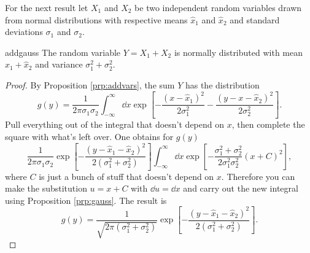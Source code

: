 For the next result 
let $X_1$ and $X_2$ be two independent random variables drawn from normal
distributions with respective means $\hat{x}_1$ and $\hat{x}_2$ and
standard deviations $\sigma_1$ and $\sigma_2$. 
\begin{proposition}{}{addgauss}
  The random variable $Y=X_1+X_2$ is normally distributed with mean
  $\hat{x}_1+\hat{x}_2$ and variance $\sigma_1^2+\sigma_2^2$.
  \begin{proof}
    By Proposition \ref{prp:addvars}, the sum $Y$ has the distribution
    \begin{equation*}
      g(y)=\frac{1}{2\pi\sigma_1\sigma_2}
           \int_{-\infty}^\infty\dd{x}\exp\left[
             -\frac{(x-\hat{x}_1)^2}{2\sigma_1^2}
             -\frac{(y-x-\hat{x}_2)^2}{2\sigma_2^2}\right].
    \end{equation*}
    Pull everything out of the integral that doesn't depend on $x$,
    then complete the square with what's left over.
    One obtains for $g(y)$
    $$
      \frac{1}{2\pi\sigma_1\sigma_2}
           \exp\left[-\frac{(y-\hat{x}_1-\hat{x}_2)^2}
                      {2(\sigma_1^2+\sigma_2^2)}\right]
           \int_{-\infty}^\infty\dd{x}
           \exp\left[-\frac{\sigma_1^2+\sigma_2^2}
                     {2\sigma_1^2\sigma_2^2}(x+C)^2\right],
    $$
    where $C$ is just a bunch of stuff that doesn't depend on $x$.
    Therefore you can make the substitution $u=x+C$ with $\dd u=\dd x$ and
    carry out the new integral using Proposition \ref{prp:gauss}.
    The result is
    \begin{equation*}
      g(y)=\frac{1}{\sqrt{2\pi(\sigma_1^2+\sigma_2^2)}}
           \exp\left[-\frac{(y-\hat{x}_1-\hat{x}_2)^2}
                      {2(\sigma_1^2+\sigma_2^2)}\right].
    \end{equation*}
  \end{proof}
\end{proposition}

